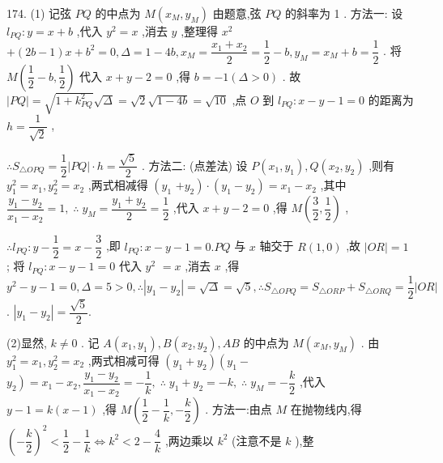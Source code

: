 174. (1) 记弦 ${PQ}$ 的中点为 $M\left( {{x}_{M},{y}_{M}}\right)$ 由题意,弦 ${PQ}$ 的斜率为 1 . 方法一: 设 ${l}_{PQ} : y = x + b$ ,代入 ${y}^{2} = x$ ,消去 $y$ ,整理得 ${x}^{2}$  $+ \left( {{2b} - 1}\right) x + {b}^{2} = 0,\Delta  = 1 - {4b},{x}_{M} = \dfrac{{x}_{1} + {x}_{2}}{2} = \dfrac{1}{2} - b,{y}_{M} = {x}_{M} + b = \dfrac{1}{2}$ . 将 $M\left( {\dfrac{1}{2} - b,\dfrac{1}{2}}\right)$ 代入 $x + y - 2 = 0$ ,得 $b =  - 1\left( {\Delta  > 0}\right)$ . 故 $\left| {PQ}\right|  = \sqrt{1 + {k}_{PQ}^{2}}\sqrt{\Delta } = \sqrt{2}\sqrt{1 - {4b}} = \sqrt{10}$ ,点 $O$ 到 ${l}_{PQ} : x - y - 1 = 0$ 的距离为 $h = \dfrac{1}{\sqrt{2}}$ ,

$\therefore {S}_{\bigtriangleup {OPQ}} = \dfrac{1}{2}\left| {PQ}\right|  \cdot  h = \dfrac{\sqrt{5}}{2}$ . 方法二: (点差法) 设 $P\left( {{x}_{1},{y}_{1}}\right) ,Q\left( {{x}_{2},{y}_{2}}\right)$ ,则有 ${y}_{1}^{2} = {x}_{1},{y}_{2}^{2} = {x}_{2}$ ,两式相减得 $\left( {y}_{1}\right.$  $\left. {+{y}_{2}}\right)  \cdot  \left( {{y}_{1} - {y}_{2}}\right)  = {x}_{1} - {x}_{2}$ ,其中 $\dfrac{{y}_{1} - {y}_{2}}{{x}_{1} - {x}_{2}} = 1,\;\therefore \;{y}_{M} = \dfrac{{y}_{1} + {y}_{2}}{2} = \dfrac{1}{2}$ ,代入 $x + y - 2 = 0$ ,得 $M\left( {\dfrac{3}{2},\dfrac{1}{2}}\right)$ ,

$\therefore {l}_{PQ} : y - \dfrac{1}{2} = x - \dfrac{3}{2}$ ,即 ${l}_{PQ} : x - y - 1 = 0.{PQ}$ 与 $x$ 轴交于 $R\left( {1,0}\right)$ ,故 $\left| {OR}\right|  = 1$ ; 将 ${l}_{PQ} : x - y - 1 = 0$ 代入 ${y}^{2}$  $= x$ ,消去 $x$ ,得 ${y}^{2} - y - 1 = 0,\Delta  = 5 > 0,\therefore \left| {{y}_{1} - {y}_{2}}\right|  = \sqrt{\Delta } = \sqrt{5},\therefore {S}_{\bigtriangleup {OPQ}} = {S}_{\bigtriangleup {ORP}} + {S}_{\bigtriangleup {ORQ}} = \dfrac{1}{2}\left| {OR}\right|$ . $\left| {{y}_{1} - {y}_{2}}\right|  = \dfrac{\sqrt{5}}{2}.$

(2)显然, $k \neq  0$ . 记 $A\left( {{x}_{1},{y}_{1}}\right) ,B\left( {{x}_{2},{y}_{2}}\right) ,{AB}$ 的中点为 $M\left( {{x}_{M},{y}_{M}}\right)$ . 由 ${y}_{1}^{2} = {x}_{1},{y}_{2}^{2} = {x}_{2}$ ,两式相减可得 $\left( {{y}_{1} + {y}_{2}}\right) \left( {{y}_{1} - }\right.$  $\left. {y}_{2}\right)  = {x}_{1} - {x}_{2},\dfrac{{y}_{1} - {y}_{2}}{{x}_{1} - {x}_{2}} =  - \dfrac{1}{k},\;\therefore \;{y}_{1} + {y}_{2} =  - k,\;\therefore \;{y}_{M} =  - \dfrac{k}{2}$ ,代入 $y - 1 = k\left( {x - 1}\right)$ ,得 $M\left( {\dfrac{1}{2} - \dfrac{1}{k}, - \dfrac{k}{2}}\right)$ . 方法一:由点 $M$ 在抛物线内,得 ${\left( -\dfrac{k}{2}\right) }^{2} < \dfrac{1}{2} - \dfrac{1}{k} \Leftrightarrow  {k}^{2} < 2 - \dfrac{4}{k}$ ,两边乘以 ${k}^{2}$ (注意不是 $k$ ),整


